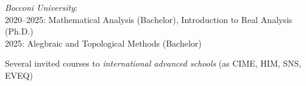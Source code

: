 \documentclass[reqno,11pt]{article}
\let\mysec\subsubsection
\newcommand{\pind}{\hangindent \parindent
  \indent}
\newcommand{\npind}{\hangindent\parindent
  \noindent}
\let\mysec\subsubsection
\newcommand{\switch}[2]{\iflanguage{italian}{#1}{#2}}
\theoremstyle{plain}
\begin{document}
\npind
\emph{Bocconi University}:\\
2020--2025: Mathematical Analysis (Bachelor), 
Introduction to Real Analysis (Ph.D.)
\\
2025: Alegbraic and Topological Methods (Bachelor)

\npind
Several invited courses to \emph{international advanced schools}
(as CIME, HIM, SNS, EVEQ)


\end{document}
